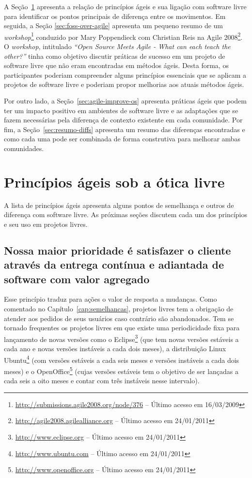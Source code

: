 A Seção~\ref{sec:principles} apresenta a relação de princípios ágeis e
sua ligação com software livre para identificar os pontos principais
de diferença entre os movimentos. Em seguida, a Seção
\ref{sec:foss-over-agile} apresenta um pequeno resumo de um
\textit{workshop}\footnote{\url{http://submissions.agile2008.org/node/376}
  -- Último acesso em 16/03/2009} conduzido por Mary Poppendieck com
Christian Reis na Agile
2008\footnote{\url{http://agile2008.agilealliance.org} -- Último
  acesso em 24/01/2011}. O \textit{workshop}, intitulado
\textit{``Open Source Meets Agile - What can each teach the other?''}
tinha como objetivo discutir práticas de sucesso em um projeto de
software livre que não eram encontradas em métodos ágeis. Desta forma,
os participantes poderiam compreender alguns princípios essenciais que
se aplicam a projetos de software livre e poderiam propor melhorias
aos atuais métodos ágeis.

Por outro lado, a Seção~\ref{sec:agile-improve-os} apresenta práticas
ágeis que podem ter um impacto positivo em ambientes de software livre
e as adaptações que se fazem necessárias pela diferença de contexto
existente em cada comunidade. Por fim, a Seção~\ref{sec:resumo-diffs}
apresenta um resumo das diferenças encontradas e como cada uma pode
ser combinada de forma construtiva para melhorar ambas comunidades.

\section{Princípios ágeis sob a ótica livre}
\label{sec:principles}

A lista de princípios ágeis apresenta alguns pontos de semelhança e
outros de diferença com software livre. As próximas seções discutem
cada um dos princípios e seu uso em projetos livres.

\subsection[Satisfação do cliente]{Nossa maior prioridade é satisfazer
  o cliente através da entrega contínua e adiantada de software com
  valor agregado}


Esse princípio traduz para ações o valor de resposta a mudanças. Como
comentado no Capítulo~\ref{cap:semelhancas}, projetos livres tem a
obrigação de atender aos pedidos de seus usuários caso contrário são
abandonados. Tem se tornado frequentes os projetos livres em que
existe uma periodicidade fixa para lançamento de novas versões como o
Eclipse\footnote{\url{http://www.eclipse.org} -- Último acesso em
  24/01/2011} (que tem novas versões estáveis a cada ano e novas
versões instáveis a cada dois meses), a distribuição Linux
Ubuntu\footnote{\url{http://www.ubuntu.com} -- Último acesso em
  24/01/2011} (com versões estáveis a cada seis meses e versões
instáveis a cada dois meses) e o
OpenOffice\footnote{\url{http://www.openoffice.org} -- Último acesso
  em 24/01/2011} (cujas versões estáveis tem o objetivo de ser
lançadas a cada seis a oito meses e contar com três instáveis nesse
intervalo).

